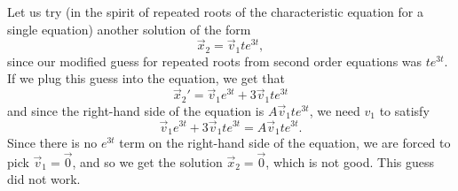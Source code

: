 \documentclass{ximera}
\begin{document}
\begin{example}
    Let us try (in the spirit of repeated roots of the characteristic equation for a single equation) another solution of the form
    \begin{equation*}
        \vec{x}_2 = \vec{v}_1 te^{3t},
    \end{equation*}
    since our modified guess for repeated roots from second order equations was $te^{3t}$. If we plug this guess into the equation, we get that
    \begin{equation*}
        \vec{x}_2' = \vec{v}_1 e^{3t} + 3\vec{v}_1te^{3t}
    \end{equation*}
    and since the right-hand side of the equation is $A\vec{v}_1te^{3t}$, we need $v_1$ to satisfy
    \begin{equation*}
        \vec{v}_1 e^{3t} + 3\vec{v}_1te^{3t} = A\vec{v}_1te^{3t}.
    \end{equation*}
    Since there is no $e^{3t}$ term on the right-hand side of the equation, we are forced to pick $\vec{v}_1 = \vec{0}$, and so  we get the solution $\vec{x}_2 = \vec{0}$, which is not good. This guess did not work.
    

\end{example}
\end{document}
